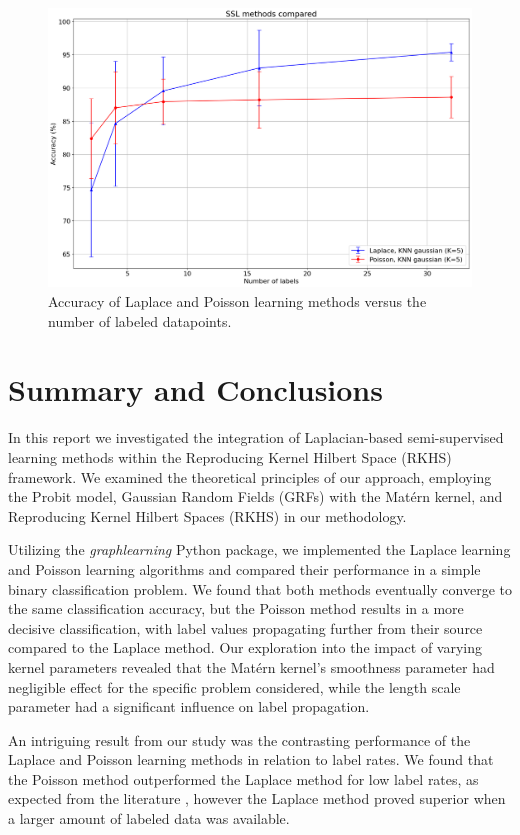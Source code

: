 \documentclass[11pt]{amsart}
\begin{document}
\begin{figure}[h!]
    \includegraphics[width=15cm]{Figs/Laplace_Poisson_label_rate.png}
    \caption{Accuracy of Laplace and Poisson learning methods versus the number of labeled datapoints.}
    \label{labelrate}
\end{figure}

\section{Summary and Conclusions}\label{sec:conclusions}

In this report we investigated the integration of Laplacian-based semi-supervised learning methods within the Reproducing Kernel Hilbert Space (RKHS) framework. We examined the theoretical principles of our approach, employing the Probit model, Gaussian Random Fields (GRFs) with the Matérn kernel, and Reproducing Kernel Hilbert Spaces (RKHS) in our methodology.

Utilizing the \textit{graphlearning} Python package, we implemented the Laplace learning and Poisson learning algorithms and compared their performance in a simple binary classification problem. We found that both methods eventually converge to the same classification accuracy, but the Poisson method results in a more decisive classification, with label values propagating further from their source compared to the Laplace method. Our exploration into the impact of varying kernel parameters revealed that the Matérn kernel's smoothness parameter had negligible effect for the specific problem considered, while the length scale parameter had a significant influence on label propagation.

An intriguing result from our study was the contrasting performance of the Laplace and Poisson learning methods in relation to label rates. We found that the Poisson method outperformed the Laplace method for low label rates, as expected from the literature \cite{pmlr-v119-calder20a}, however the Laplace method proved superior when a larger amount of labeled data was available.
\end{document}
